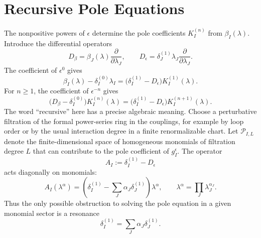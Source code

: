 \section{Recursive Pole Equations}

The nonpositive powers of \(\epsilon\) determine the pole coefficients
\(K_I^{(n)}\) from \(\beta_I(\lambda)\).  Introduce the differential operators
\[
  D_\beta=\beta_J(\lambda)\frac{\partial}{\partial\lambda_J},
  \qquad
  D_\epsilon
  =
  \delta_J^{(1)}\lambda_J
  \frac{\partial}{\partial\lambda_J}.
\]
The coefficient of \(\epsilon^0\) gives
\[
  \beta_I(\lambda)-\delta_I^{(0)}\lambda_I
  =
  \bigl(\delta_I^{(1)}-D_\epsilon\bigr)K_I^{(1)}(\lambda).
\]
For \(n\ge1\), the coefficient of \(\epsilon^{-n}\) gives
\[
  \bigl(D_\beta-\delta_I^{(0)}\bigr)K_I^{(n)}(\lambda)
  =
  \bigl(\delta_I^{(1)}-D_\epsilon\bigr)
  K_I^{(n+1)}(\lambda).
\]
The word ``recursive'' here has a precise algebraic meaning.  Choose a
perturbative filtration of the formal power-series ring in the couplings, for
example by loop order or by the usual interaction degree in a finite
renormalizable chart.  Let \(\mathcal P_{I,L}\) denote the finite-dimensional
space of homogeneous monomials of filtration degree \(L\) that can contribute
to the pole coefficient of \(g_I^\epsilon\).  The operator
\[
  A_I:=\delta_I^{(1)}-D_\epsilon
\]
acts diagonally on monomials:
\[
  A_I(\lambda^\alpha)
  =
  \left(
    \delta_I^{(1)}
    -
    \sum_J\alpha_J\delta_J^{(1)}
  \right)\lambda^\alpha,
  \qquad
  \lambda^\alpha=\prod_J\lambda_J^{\alpha_J}.
\]
Thus the only possible obstruction to solving the pole equation in a given
monomial sector is a resonance
\[
  \delta_I^{(1)}=\sum_J\alpha_J\delta_J^{(1)}.
\]

